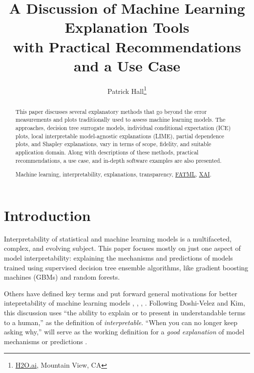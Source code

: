 \documentclass[11pt]{asaproc}
\title{A Discussion of Machine Learning Explanation Tools\\ with Practical Recommendations and a Use Case}
\author{Patrick Hall\thanks{\href{https://www.h2o.ai}{H2O.ai}, Mountain View, CA}
}
\begin{document}
\maketitle

\begin{abstract}

This paper discusses several explanatory methods that go beyond the error measurements and plots 			traditionally used to assess machine learning models. The approaches, decision tree surrogate models, individual conditional expectation (ICE) plots, local interpretable model-agnostic explanations (LIME), partial dependence plots, and Shapley explanations, vary in terms of scope, fidelity, and suitable application domain. Along with descriptions of these methods, practical recommendations, a use case, and in-depth software examples are also presented.

\begin{keywords}
Machine learning, interpretability, explanations, transparency, \href{https://www.fatml.org/}{FATML}, \href{https://www.darpa.mil/program/explainable-artificial-intelligence}{XAI}.
\end{keywords}
\end{abstract}

\section{Introduction}

Interpretability of statistical and machine learning models is a multifaceted, complex, and evolving subject. This paper focuses mostly on just one aspect of model interpretability: explaining the mechanisms and predictions of models trained using supervised decision tree ensemble algorithms, like gradient boosting machines (GBMs) and random forests. 

Others have defined key terms and put forward general motivations for better intepretability of machine learning models \cite{been_kim1}, \cite{gilpin2018explaining}, \cite{guidotti2018survey}, \cite{lipton1}. Following Doshi-Velez and Kim, this discussion uses ``the ability to explain or to present in understandable terms to a human,'' as the definition of \textit{interpretable}. ``When you can no longer keep asking why,'' will serve as the working definition for a \textit{good explanation} of model mechanisms or predictions \cite{gilpin2018explaining}. 
	
\end{document}
